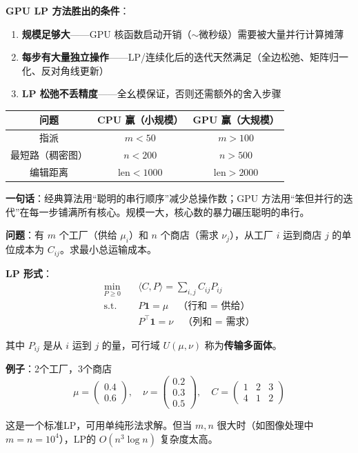 \documentclass[12pt, a4paper]{ctexart}
\begin{document}
\begin{blackboard}

\textbf{GPU LP 方法胜出的条件}：
\begin{enumerate}
    \item \textbf{规模足够大}——GPU 核函数启动开销（$\sim$微秒级）需要被大量并行计算摊薄
    \item \textbf{每步有大量独立操作}——LP/连续化后的迭代天然满足（全边松弛、矩阵归一化、反对角线更新）
    \item \textbf{LP 松弛不丢精度}——全幺模保证，否则还需额外的舍入步骤
\end{enumerate}

\begin{center}
\begin{tabular}{c|c|c}
问题 & CPU 赢（小规模） & GPU 赢（大规模） \\
\hline
指派 & $m < 50$ & $m > 100$ \\
最短路（稠密图） & $n < 200$ & $n > 500$ \\
编辑距离 & $\text{len} < 1000$ & $\text{len} > 2000$
\end{tabular}
\end{center}

\textbf{一句话}：经典算法用``聪明的串行顺序''减少总操作数；GPU 方法用``笨但并行的迭代''在每一步铺满所有核心。规模一大，核心数的暴力碾压聪明的串行。

\end{blackboard}



\begin{blackboard}[最优传输问题]

\textbf{问题}：有 $m$ 个工厂（供给 $\mu_i$）和 $n$ 个商店（需求 $\nu_j$），从工厂 $i$ 运到商店 $j$ 的单位成本为 $C_{ij}$。求最小总运输成本。

\textbf{LP 形式}：
\begin{align*}
\min_{P \geq 0} \quad & \langle C, P \rangle = \sum_{i,j} C_{ij} P_{ij} \\
\text{s.t.} \quad & P \mathbf{1} = \mu \quad \text{（行和 = 供给）} \\
& P^\top \mathbf{1} = \nu \quad \text{（列和 = 需求）}
\end{align*}

其中 $P_{ij}$ 是从 $i$ 运到 $j$ 的量，可行域 $U(\mu, \nu)$ 称为\textbf{传输多面体}。

\textbf{例子}：2个工厂，3个商店
\[
\mu = \begin{pmatrix} 0.4 \\ 0.6 \end{pmatrix}, \quad
\nu = \begin{pmatrix} 0.2 \\ 0.3 \\ 0.5 \end{pmatrix}, \quad
C = \begin{pmatrix} 1 & 2 & 3 \\ 4 & 1 & 2 \end{pmatrix}
\]

这是一个标准LP，可用单纯形法求解。但当 $m, n$ 很大时（如图像处理中 $m = n = 10^4$），LP的 $O(n^3 \log n)$ 复杂度太高。

\end{blackboard}
\end{document}

